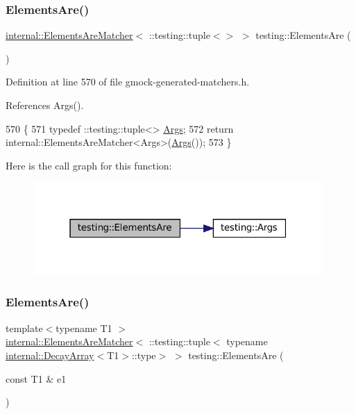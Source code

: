 \subsubsection{\texorpdfstring{Elements\+Are()}{ElementsAre()}\hspace{0.1cm}{\footnotesize\ttfamily [1/11]}}
{\footnotesize\ttfamily \hyperlink{classtesting_1_1internal_1_1ElementsAreMatcher}{internal\+::\+Elements\+Are\+Matcher}$<$ \+::testing\+::tuple$<$$>$ $>$ testing\+::\+Elements\+Are (\begin{DoxyParamCaption}{ }\end{DoxyParamCaption})\hspace{0.3cm}{\ttfamily [inline]}}



Definition at line 570 of file gmock-\/generated-\/matchers.\+h.



References Args().


\begin{DoxyCode}
570               \{
571   typedef ::testing::tuple<> \hyperlink{namespacetesting_a09ac462e8d6ed468cbfaa9c767aee0aa}{Args};
572   \textcolor{keywordflow}{return} internal::ElementsAreMatcher<Args>(\hyperlink{namespacetesting_a09ac462e8d6ed468cbfaa9c767aee0aa}{Args}());
573 \}
\end{DoxyCode}
Here is the call graph for this function\+:
\nopagebreak
\begin{figure}[H]
\begin{center}
\leavevmode
\includegraphics[width=313pt]{namespacetesting_a79cf4ae694bf8231dcf283b325405f27_cgraph}
\end{center}
\end{figure}
\mbox{\label{namespacetesting_aa35aa6c9638d989e9f4aaa6009f60589}} 
\subsubsection{\texorpdfstring{Elements\+Are()}{ElementsAre()}\hspace{0.1cm}{\footnotesize\ttfamily [2/11]}}
{\footnotesize\ttfamily template$<$typename T1 $>$ \\
\hyperlink{classtesting_1_1internal_1_1ElementsAreMatcher}{internal\+::\+Elements\+Are\+Matcher}$<$ \+::testing\+::tuple$<$ typename \hyperlink{structtesting_1_1internal_1_1DecayArray}{internal\+::\+Decay\+Array}$<$T1$>$\+::type$>$ $>$ testing\+::\+Elements\+Are (\begin{DoxyParamCaption}\item[{const T1 \&}]{e1 }\end{DoxyParamCaption})\hspace{0.3cm}{\ttfamily [inline]}}



